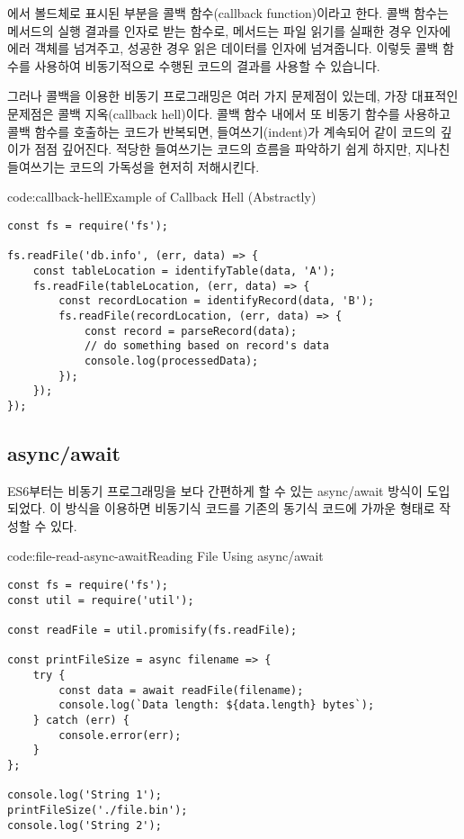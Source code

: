 에서 볼드체로 표시된 부분을 콜백 함수(callback function)이라고 한다. 콜백 함수는 메서드의 실행 결과를 인자로 받는 함수로,  메서드는 파일 읽기를 실패한 경우  인자에 에러 객체를 넘겨주고, 성공한 경우 읽은 데이터를  인자에 넘겨줍니다. 이렇듯 콜백 함수를 사용하여 비동기적으로 수행된 코드의 결과를 사용할 수 있습니다.

그러나 콜백을 이용한 비동기 프로그래밍은 여러 가지 문제점이 있는데, 가장 대표적인 문제점은 콜백 지옥(callback hell)이다. 콜백 함수 내에서 또 비동기 함수를 사용하고 콜백 함수를 호출하는 코드가 반복되면, 들여쓰기(indent)가 계속되어 \과 같이 코드의 깊이가 점점 깊어진다. 적당한 들여쓰기는 코드의 흐름을 파악하기 쉽게 하지만, 지나친 들여쓰기는 코드의 가독성을 현저히 저해시킨다.

\begin{codeenv}{code:callback-hell}{Example of Callback Hell (Abstractly)}\begin{verbatim}
const fs = require('fs');

fs.readFile('db.info', (err, data) => {
    const tableLocation = identifyTable(data, 'A');
    fs.readFile(tableLocation, (err, data) => {
        const recordLocation = identifyRecord(data, 'B');
        fs.readFile(recordLocation, (err, data) => {
            const record = parseRecord(data);
            // do something based on record's data
            console.log(processedData);
        });
    });
});
\end{verbatim}
\end{codeenv}

\subsection*{async/await}

ES6부터는 비동기 프로그래밍을 보다 간편하게 할 수 있는 async/await 방식이 도입되었다. 이 방식을 이용하면 비동기식 코드를 기존의 동기식 코드에 가까운 형태로 작성할 수 있다.

\begin{codeenv}{code:file-read-async-await}{Reading File Using async/await}\begin{verbatim}
const fs = require('fs');
const util = require('util');

const readFile = util.promisify(fs.readFile);

const printFileSize = async filename => {
    try {
        const data = await readFile(filename);
        console.log(`Data length: ${data.length} bytes`);
    } catch (err) {
        console.error(err);
    }
};

console.log('String 1');
printFileSize('./file.bin');
console.log('String 2');
\end{verbatim}
\end{codeenv}

